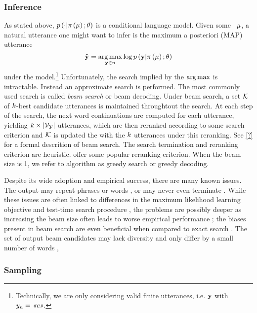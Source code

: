 \subsubsection{Inference}

As stated above, $p\left(\cdot|\pi\left(\mu\right);\theta\right)$ is a conditional language model.
Given some \meaningrepresentation~$\mu$, a natural utterance one might want to infer is the 
maximum a posteriori (MAP)
 utterance \[\boldsymbol{\hat{\mathbf{y}}} = \operatorname*{arg\,max}_{\mathbf{y}\in n} \log p\left(\mathbf{y}|\pi\left(\mu\right);\theta \right) \] under the model.\footnote{Technically, we are only considering valid finite utterances, i.e. $\mathbf{y}$ with $y_n = \textit{<<e>>}$. } Unfortunately, the search implied by the $\operatorname*{arg\,max}$
is intractable. Instead an approximate search is performed. The most commonly used search
is called \textit{beam search} \citep{reddy1977} or beam decoding. 
Under beam search, a set $\mathcal{K}$ 
of $k$-best
candidate utterances is maintained throughtout the search. At each step of the search,
the next word continuations are computed for each utterance, yielding $k \times \lvert\mathcal{V}_{\mathcal{Y}}\rvert$ utterances,
which are then reranked according to some search criterion and $\mathcal{K}$ is updated the with
the $k$ utterances under this reranking. 
See \autoref{?} for a formal descrition of beam search.
The search termination and reranking criterion
are heuristic. \cite{neuraltextpractical} offer some popular reranking criterion. When the beam size
is 1, we refer to algorithm as greedy search or greedy decoding.

Despite its wide adoption and empirical success, there are many known issues. 
The output may repeat phrases or words \citep{soemthig}, or may never even terminate \citep{cho}.
While these issues are often linked to differences in the maximum likelihood learning objective
and test-time search procedure \citep{andor,mccallum}, the problems are possibly deeper as 
increasing the beam size often leads to worse empirical performance \citep{kohn}; the biases present in beam search are even beneficial when compared to exact search \citet{exactsearch}.
The set of output
beam candidates may lack diversity and only differ by a small number of words \citep{somebody},

\subsubsection{Sampling}

